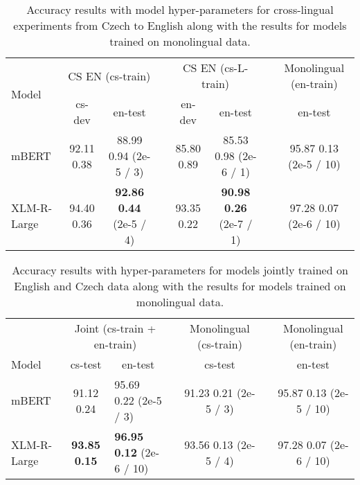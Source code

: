\documentclass[10pt, a4paper]{article}
\begin{document}
\begin{table*}[ht!]
\begin{adjustbox}{width=0.95\linewidth,center}
\begin{tabular}{lccccccc} \toprule
 \multirow{2}{*}{Model}             & \multicolumn{2}{c}{CS  EN (cs-train)} & & \multicolumn{2}{c}{CS  EN (cs-L-train)}  & & \multicolumn{1}{c}{Monolingual (en-train)} \\ \cline{2-3} \cline{5-6} \cline{8-8}
     & cs-dev           & en-test    &      & en-dev           & en-test       &  & en-test         \\ \midrule
mBERT & 92.11  0.38     & 88.99  0.94 \footnotesize{(2e-5 / 3)} &      &        85.80  0.89                   &    85.53  0.98  \footnotesize{(2e-6 / 1)}           & &  95.87  0.13  \footnotesize{(2e-5 / 10)}   \\
XLM-R-Large & 94.40  0.36     & \textbf{92.86}  \textbf{0.44} \footnotesize{(2e-5 / 4)} & &         93.35  0.22                     &       \textbf{90.98}  \textbf{0.26}   \footnotesize{(2e-7 / 1)}           &  &  97.28  0.07 \footnotesize{(2e-6 / 10)} \\ \bottomrule
\end{tabular}
\end{adjustbox}
\caption{Accuracy results with model hyper-parameters for cross-lingual experiments from Czech to English along with the results for models trained on monolingual data.} \label{tab:hyper-crosslingual-cs-en}
\end{table*}

\begin{table*}[t]
\begin{adjustbox}{width=0.90\linewidth,center}
\begin{tabular}{lclcccc} \toprule
            & \multicolumn{2}{c}{Joint (cs-train + en-train)} && \multicolumn{1}{c}{Monolingual (cs-train)} &&  Monolingual (en-train) \\ \cline{2-3} \cline{5-5} \cline{7-7}
Model       & cs-test        & \multicolumn{1}{c}{en-test}       && cs-test            && en-test             \\ \midrule
mBERT       & 91.12  0.24   & 95.69  0.22 \footnotesize{(2e-5 / 3)}  && 91.23  0.21 \footnotesize{(2e-5 / 3)} && 95.87  0.13 \footnotesize{(2e-5 / 10)} \\
XLM-R-Large & \textbf{93.85}  \textbf{0.15}   & \textbf{96.95}  \textbf{0.12} \footnotesize{(2e-6 / 10)}  && 93.56  0.13 \footnotesize{(2e-5 / 4)} && 97.28  0.07 \footnotesize{(2e-6 / 10)} \\ \bottomrule
\end{tabular}
\end{adjustbox}
\caption{Accuracy results with hyper-parameters for models jointly trained on English and Czech data along with the results for models trained on monolingual data.} \label{tab:hyper-crosslingual-joint}
\end{table*}
\end{document}
